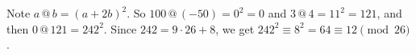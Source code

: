 Note $a\,@\,b=(a+2b)^2$. So $100\,@\,(-50)=0^2=0$ and $3\,@\,4=11^2=121$, and then $0\,@\,121=242^2$. Since $242=9\cdot26+8$, we get $242^2\equiv8^2=64\equiv\boxed{12}\pmod{26}$.
